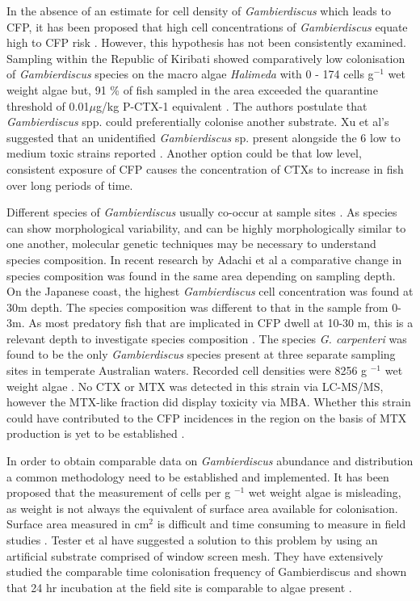 \documentclass[12pt]{article}
\begin{document}
In the absence of an estimate for cell density of \emph{Gambierdiscus} which leads to CFP, it has been proposed  that high cell concentrations of \emph{Gambierdiscus} equate high to CFP risk \cite{litaker2010global}. 
However, this hypothesis has not been consistently examined. Sampling within the Republic of Kiribati showed comparatively low colonisation of \emph{Gambierdiscus} species on the macro algae \emph{Halimeda} with 0 - 174 cells g$^{-1}$ wet weight algae but, 91 \% of fish sampled in the area exceeded the quarantine threshold of 0.01$\mu$g/kg P-CTX-1 equivalent \cite{xu2014distribution,chan2011spatial}. The authors postulate that \emph{Gambierdiscus} spp. could preferentially colonise another substrate. Xu et al's suggested that an unidentified \emph{Gambierdiscus} sp. present alongside the 6 low to medium toxic strains reported \cite{xu2014distribution,bomber1988r}. Another option could be that low level, consistent exposure of CFP causes the concentration of CTXs to increase in fish over long periods of time.

Different species of \emph{Gambierdiscus} usually co-occur at sample sites \cite{litaker2010global}. As species can show morphological variability, and can be highly morphologically similar to one another, molecular genetic techniques may be necessary to understand species composition.
In recent research by Adachi et al a comparative change in species composition was found in the same area depending on sampling depth. On the Japanese coast, the highest \emph{Gambierdiscus} cell concentration was found at 30m depth. The  species composition was different to that in the sample from 0-3m. As most predatory fish that are implicated in CFP dwell at 10-30 m, this is a relevant depth to investigate species composition \cite{adachiICHA}. 
The species \emph{G. carpenteri} was found to be the only \emph{Gambierdiscus} species present at three separate sampling sites in temperate Australian waters. Recorded cell densities were 8256 g $^{-1}$ wet weight algae \cite{kohli2014high}. No CTX or MTX was detected in this strain via LC-MS/MS, however the MTX-like fraction did display toxicity via MBA. Whether this strain could have contributed to the CFP incidences in the region on the basis of MTX production is yet to be established  \cite{kohli2014high}. 
 
In order to obtain comparable data on \emph{Gambierdiscus} abundance and distribution a common methodology need to be established and implemented. It has been proposed that the measurement of cells per g $^{-1}$ wet weight algae is misleading, as weight is not always the equivalent of surface area available for colonisation. Surface area measured in cm$^{2}$ is difficult and time consuming to measure in field studies \cite{parsonICHA,lobel1988assessment}. Tester et al have suggested a solution to this problem by using an artificial substrate comprised of window screen mesh. They have extensively studied the comparable time colonisation frequency of Gambierdiscus and shown that 24 hr incubation at the field site is comparable to algae present \cite{tester2ICHA,tester2014sampling}. 
\end{document}
